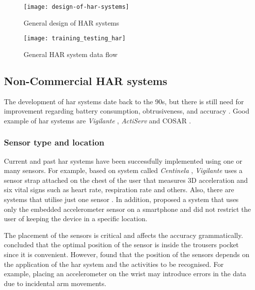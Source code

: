    \begin{figure}[ht]
        \centering
        \texttt{[image: design-of-har-systems]}
        \caption{General design of HAR systems}
        \label{fig:design-of-har}
    \end{figure}
    
    \begin{figure}[ht]
        \centering
        \texttt{[image: training\_testing\_har]}
        \caption{General HAR system data flow}
        \label{fig:har-data-flow}
    \end{figure}

    \subsection{Non-Commercial HAR systems}
    
    The development of \gls{har} systems date back to the 90s, but there is still need for improvement regarding battery consumption, obtrusiveness, and accuracy \citet[29]{labrador2013}. Good example of \gls{har} systems are \textit{Vigilante} \citep[38-39]{lara2012}, \textit{ActiServ} \citep{berchtold2010} and COSAR \citep[271-289]{riboni2010}.
    
        \subsubsection{Sensor type and location}
        Current and past \gls{har} systems have been successfully implemented using one or many sensors. For example, based on system called \textit{Centinela} \citep[38]{lara2012a}, \textit{Vigilante} uses a sensor strap attached on the chest of the user that measures 3D acceleration and six vital signs such as heart rate, respiration rate and others. Also, there are systems that utilise just one sensor \citep[1-3]{paul2015}. In addition, \citet[1-4]{torreshuitzil2015} proposed a system that uses only the embedded accelerometer sensor on a smartphone and did not restrict the user of keeping the device in a specific location.
        
        The placement of the sensors is critical and affects the accuracy grammatically. \citet[2245–2250]{he2008} concluded that the optimal position of the sensor is inside the trousers pocket since it is convenient. However, \citet[1194]{lara2013} found that the position of the sensors depends on the application of the \gls{har} system and the activities to be recognised. For example, placing an accelerometer on the wrist may introduce errors in the data due to incidental arm movements.
        
